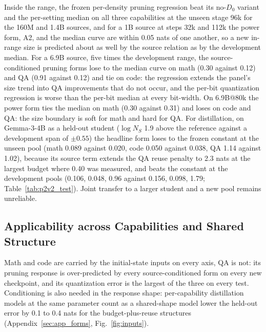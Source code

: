 Inside the range, the frozen per-density pruning regression beat its
no-$D_0$ variant and the per-setting median on all three capabilities
at the unseen stage 96k for the 160M and 1.4B sources, and for a 1B
source at steps 32k and 112k the power form, A2, and the median curve
are within 0.05 nats of one another, so a new in-range size is
predicted about as well by the source relation as by the development
median. For a 6.9B source, five times the development range, the
source-conditioned pruning forms lose to the median curve on math
(0.30 against 0.12) and QA (0.91 against 0.12) and tie on code: the
regression extends the panel's size trend into QA improvements that
do not occur, and the per-bit quantization regression is worse than
the per-bit median at every bit-width. On 6.9B@80k the power form
ties the median on math (0.30 against 0.31) and loses on code and QA:
the size boundary is soft for math and hard for QA. For distillation,
on Gemma-3-4B as a held-out student ($\log N_S$ 1.9 above the
reference against a development span of $\pm0.55$) the headline form
loses to the frozen constant at the unseen pool (math 0.089 against
0.020, code 0.050 against 0.038, QA 1.14 against 1.02), because its
source term extends the QA reuse penalty to 2.3 nats at the largest
budget where 0.40 was measured, and beats the constant at the
development pools (0.106, 0.048, 0.96 against 0.156, 0.098, 1.79;
Table~\ref{tab:p2v2_test}). Joint transfer to a larger student and a
new pool remains unreliable.

\subsection{Applicability across Capabilities and Shared Structure}
\label{sec:capabilities}

Math and code are carried by the initial-state inputs on every axis,
QA is not: its pruning response is over-predicted by every
source-conditioned form on every new checkpoint, and its quantization
error is the largest of the three on every test. Conditioning is also
needed in the response shape: per-capability distillation models at
the same parameter count as a shared-shape model lower the held-out
error by 0.1 to 0.4 nats for the budget-plus-reuse structures
(Appendix~\ref{sec:app_forms}, Fig.~\ref{fig:inputs}).

